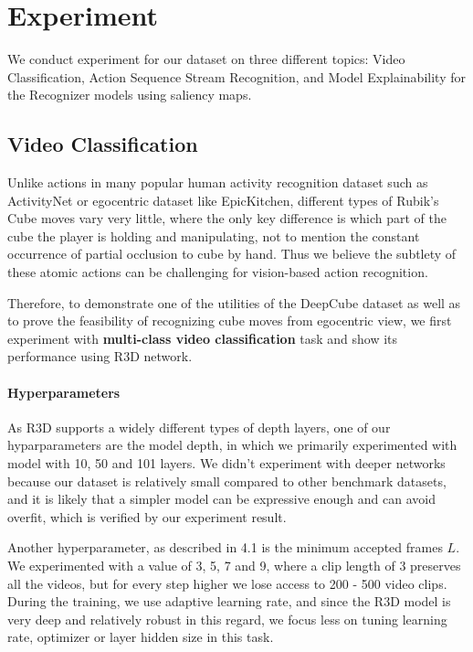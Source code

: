 \documentclass[10pt,twocolumn,letterpaper]{article}
\begin{document}


\section{Experiment}
We conduct experiment for our dataset on three different topics: Video Classification, Action Sequence Stream Recognition, and Model Explainability for the Recognizer models using saliency maps.

\subsection{Video Classification}
Unlike actions in many popular human activity recognition dataset such as ActivityNet\cite{activitynet} or egocentric dataset like EpicKitchen\cite{epic_kitchen}, different types of Rubik's Cube moves vary very little, where the only key difference is which part of the cube the player is holding and manipulating, not to mention the constant occurrence of partial occlusion to cube by hand. Thus we believe the subtlety of these atomic actions can be challenging for vision-based action recognition. 

Therefore, to demonstrate one of the utilities of the DeepCube dataset as well as to prove the feasibility of recognizing cube moves from egocentric view, we first experiment with \textbf{multi-class video classification} task and show its performance using R3D network.

\paragraph{Hyperparameters}
As R3D supports a widely different types of depth layers, one of our hyparparameters are the model depth, in which we primarily experimented with model with 10, 50 and 101 layers. We didn't experiment with deeper networks because our dataset is relatively small compared to other benchmark datasets, and it is likely that a simpler model can be expressive enough and can avoid overfit, which is verified by our experiment result. 

Another hyperparameter, as described in 4.1 is the minimum accepted frames $L$. We experimented with a value of 3, 5, 7 and 9, where a clip length of 3 preserves all the videos, but for every step higher we lose access to 200 - 500 video clips. During the training, we use adaptive learning rate, and since the R3D model is very deep and relatively robust in this regard, we focus less on tuning learning rate, optimizer or layer hidden size in this task.
\end{document}
